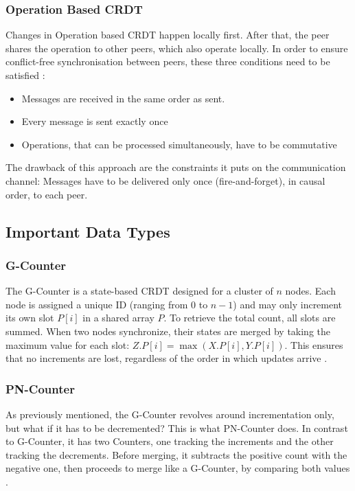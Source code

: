 \subsubsection{Operation Based CRDT}

Changes in Operation based CRDT happen locally first. After that, the peer shares
the operation to other peers, which also operate locally. In order to ensure conflict-free
synchronisation between peers, these three conditions need to be satisfied \cite{operation_based_overview}:

\begin{itemize}
    \item Messages are received in the same order as sent.
    \item Every message is sent exactly once
    \item Operations, that can be processed simultaneously, have to be commutative
\end{itemize}

The drawback of this approach are the constraints it puts on the communication channel:
Messages have to be delivered only once (fire-and-forget), in causal order, to each peer\cite{sending_order}.

\subsection{Important Data Types}

\subsubsection{G-Counter}

The G-Counter is a state-based CRDT designed for a cluster of $n$ nodes. Each node is assigned a unique ID (ranging from $0$ to $n-1$)
and may only increment its own slot $P[i]$ in a shared array $P$. To retrieve the total count, all slots are summed. When two nodes synchronize,
their states are merged by taking the maximum value for each slot: $Z.P[i] = \max(X.P[i], Y.P[i])$. This ensures that no increments are lost,
regardless of the order in which updates arrive \cite{shapiro2011crdt}.


\subsubsection{PN-Counter}

As previously mentioned, the G-Counter revolves around incrementation only, but what if it has to be decremented?
This is what PN-Counter does. In contrast to G-Counter, it has two Counters, one tracking the increments and the other
tracking the decrements. Before merging, it subtracts the positive count with the negative one, then proceeds to merge
like a G-Counter, by comparing both values \cite{PN_Counter}.


